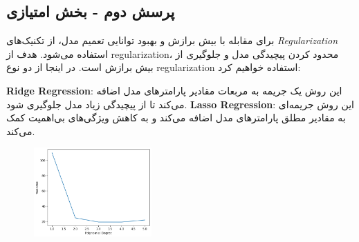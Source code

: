 \documentclass{article}
\begin{document}
\subsection{پرسش دوم - بخش امتیازی}
برای مقابله با بیش برازش و بهبود توانایی تعمیم مدل، از تکنیک‌های \textit{Regularization} استفاده می‌شود. هدف از regularization، محدود کردن پیچیدگی مدل و جلوگیری از بیش برازش است. در اینجا از دو نوع regularization استفاده خواهیم کرد:

\textbf{Ridge Regression}: این روش یک جریمه به مربعات مقادیر پارامترهای مدل اضافه می‌کند تا از پیچیدگی زیاد مدل جلوگیری شود.
\textbf{Lasso Regression}: این روش جریمه‌ای به مقادیر مطلق پارامترهای مدل اضافه می‌کند و به کاهش ویژگی‌های بی‌اهمیت کمک می‌کند.

\begin{figure}[!h]
    \centering
    \includegraphics[width=0.4\textwidth]{img/8.png}
\end{figure}
\end{document}
